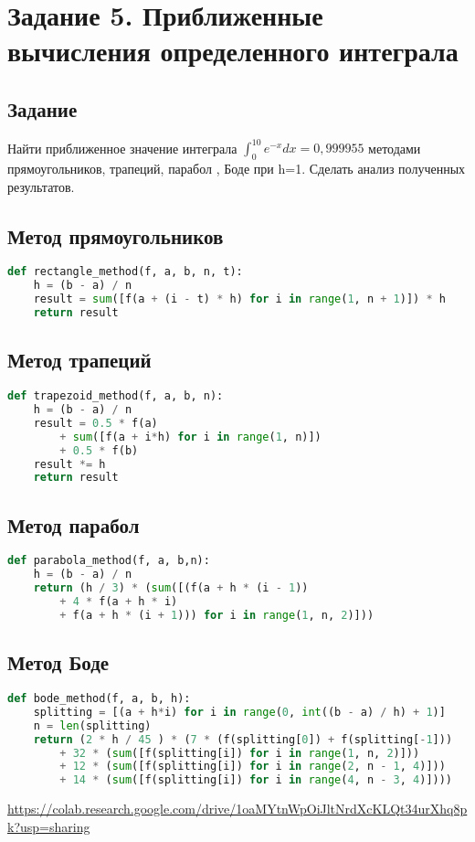 \section{Задание 5. Приближенные вычисления определенного интеграла}
\subsection*{Задание}
Найти приближенное значение интеграла $ \int_0^{10}{e^{-x}	dx} = 0,999955 $ методами прямоугольников, трапеций, парабол , Боде при h=1. Сделать анализ полученных результатов.
\subsection*{Метод прямоугольников}
\begin{lstlisting}[language=Python]
def rectangle_method(f, a, b, n, t):
	h = (b - a) / n
	result = sum([f(a + (i - t) * h) for i in range(1, n + 1)]) * h
	return result
\end{lstlisting}
\subsection*{Метод трапеций}
\begin{lstlisting}[language=Python]
def trapezoid_method(f, a, b, n):
	h = (b - a) / n
	result = 0.5 * f(a) 
		+ sum([f(a + i*h) for i in range(1, n)]) 
		+ 0.5 * f(b)
	result *= h
	return result
\end{lstlisting}
\subsection*{Метод парабол}
\begin{lstlisting}[language=Python]
def parabola_method(f, a, b,n):
	h = (b - a) / n
	return (h / 3) * (sum([(f(a + h * (i - 1)) 
		+ 4 * f(a + h * i) 
		+ f(a + h * (i + 1))) for i in range(1, n, 2)]))
\end{lstlisting}
\subsection*{Метод Боде}
\begin{lstlisting}[language=Python]
def bode_method(f, a, b, h):
	splitting = [(a + h*i) for i in range(0, int((b - a) / h) + 1)]
	n = len(splitting)
	return (2 * h / 45 ) * (7 * (f(splitting[0]) + f(splitting[-1])) 
		+ 32 * (sum([f(splitting[i]) for i in range(1, n, 2)]))
		+ 12 * (sum([f(splitting[i]) for i in range(2, n - 1, 4)])) 
		+ 14 * (sum([f(splitting[i]) for i in range(4, n - 3, 4)])))
\end{lstlisting}
\url{https://colab.research.google.com/drive/1oaMYtnWpOiJltNrdXcKLQt34urXhq8pk?usp=sharing}
